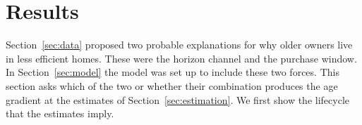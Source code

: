 \section{Results}\label{sec:results}


 Section~\ref{sec:data} proposed two probable explanations for why older owners
live in less efficient homes. These were the  horizon channel and the purchase window. In Section~\ref{sec:model} the model was set up to include these two forces. This section asks
which of the two or whether their combination produces the age gradient at the estimates of
Section~\ref{sec:estimation}. We first show the lifecycle that the
estimates imply.

